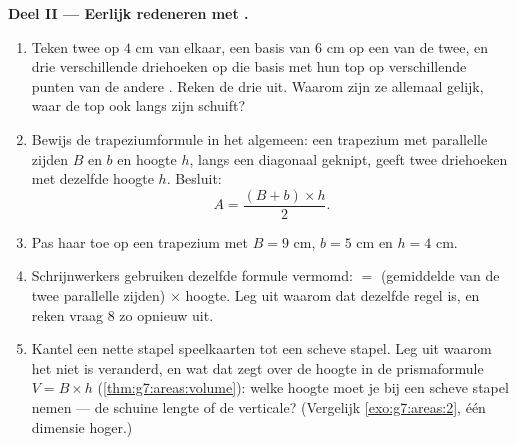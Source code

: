 \begin{problem}[{Weekendopgave --- een beroemd ``bewijs'' dat $64 = 65$, ontmaskerd
met oppervlaktes en hellingen, met pizza's en ringen als nagerecht}]
\medskip
\noindent\textbf{Deel II --- Eerlijk redeneren met .}
\begin{enumerate}[resume]
  \item Teken twee  op $4$ cm van elkaar, een basis van $6$ cm op een
        van de twee, en drie verschillende driehoeken op die basis met hun top op
        verschillende punten van de andere . Reken de drie  uit.
        Waarom zijn ze allemaal gelijk, waar de top ook langs zijn  schuift?
  \item Bewijs de trapeziumformule in het algemeen: een trapezium met parallelle
        zijden $B$ en $b$ en hoogte $h$, langs een diagonaal geknipt, geeft twee
        driehoeken met dezelfde hoogte $h$. Besluit:
        \[
        A = \frac{(B + b) \times h}{2} .
        \]
  \item Pas haar toe op een trapezium met $B = 9$ cm, $b = 5$ cm en $h = 4$ cm.
  \item Schrijnwerkers gebruiken dezelfde formule vermomd:  $=$
        (gemiddelde van de twee parallelle zijden) $\times$ hoogte. Leg uit waarom dat
        dezelfde regel is, en reken vraag 8 zo opnieuw uit.
  \item Kantel een nette stapel speelkaarten tot een scheve stapel. Leg uit waarom het
         niet is veranderd, en wat dat zegt over de hoogte in de prismaformule
        $V = B \times h$ (\cref{thm:g7:areas:volume}): welke hoogte moet je bij een
        scheve stapel nemen --- de schuine lengte of de verticale? (Vergelijk
        \cref{exo:g7:areas:2}, één dimensie hoger.)
\end{enumerate}


\end{problem}
